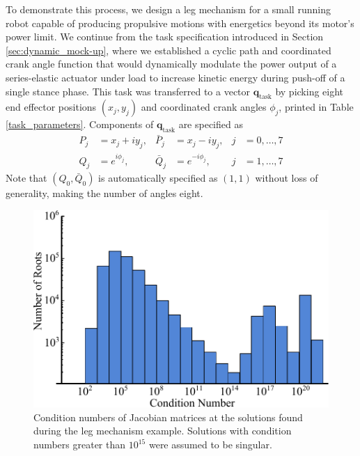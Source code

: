 \documentclass[journal]{IEEEtran}
\def\*#1{\bar{#1}} %
\begin{document}
To demonstrate this process, we design a leg mechanism for a small running robot capable of producing propulsive motions with energetics beyond its motor's power limit.
We continue from the task specification introduced in Section \ref{sec:dynamic_mock-up}, where we established a cyclic path and coordinated crank angle function that would dynamically modulate the power output of a series-elastic actuator under load to increase kinetic energy during push-off of a single stance phase.
This task was transferred to a vector $\mathbf{q}_\text{task}$ by picking eight end effector positions $(x_j,y_j)$ and coordinated crank angles $\phi_j$, printed in Table \ref{task_parameters}.  Components of $\mathbf{q}_\text{task}$ are specified as
\begin{align}
P_j &= x_j + iy_j, & \*P_j &= x_j - iy_j, & j&=0,\ldots,7 \nonumber\\
Q_j &= e^{i\phi_j}, & \*Q_j &= e^{-i\phi_j}, & j&=1,\ldots,7 
\end{align}
Note that $(Q_0,\*Q_0)$ is automatically specified as $(1,1)$ without loss of generality, making the number of angles eight.



\begin{figure}[!t]
\centering
\includegraphics[scale=0.5]{root_histogram}
\caption{Condition numbers of Jacobian matrices at the solutions found during the leg mechanism example.  Solutions with condition numbers greater than $10^{15}$ were assumed to be singular.}
\label{root_histogram}
\end{figure}
\end{document}
